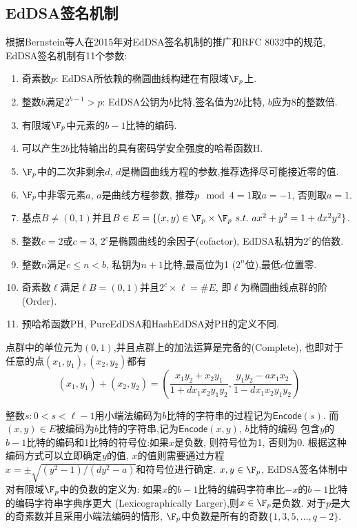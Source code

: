 \subsection{EdDSA签名机制}

根据Bernstein等人在2015年对EdDSA签名机制的推广和RFC 8032中的规范, EdDSA签名机制有11个参数:
\begin{enumerate}
\item 
奇素数$p$: EdDSA所依赖的椭圆曲线构建在有限域$\F_p$上.
\item 
整数$b$满足$2^{b-1} > p$: EdDSA公钥为$b$比特,签名值为$2b$比特, $b$应为8的整数倍.
\item
有限域$\F_p$中元素的$b-1$比特的编码.
\item
可以产生$2b$比特输出的具有密码学安全强度的哈希函数\textsf{H}.
\item
$\F_p$中的二次非剩余$d$, $d$是椭圆曲线方程的参数,推荐选择尽可能接近零的值.
\item
$\F_p$中非零元素$a$, $a$是曲线方程参数, 推荐$p \mod 4=1$取$a=-1$, 否则取$a=1$.
\item 
基点$B \neq (0, 1)$并且$B \in E = \{(x,y) \in \F_p \times \F_p\ s.t.\ ax^2 + y^2 = 1 + dx^2y^2\}$.
\item
整数$c = 2$或$c = 3$, $2^c$是椭圆曲线的余因子(cofactor), EdDSA私钥为$2^c$的倍数.
\item
整数$n$满足$c \leq n < b$, 私钥为$n+1$比特,最高位为1 ($2^n$位),最低$c$位置零.
\item
奇素数$\ell$满足$\ell B = (0,1)$并且$2^c \times \ell = \# E$, 即$\ell$为椭圆曲线点群的阶(Order).
\item
预哈希函数\textsf{PH}, \textsf{PureEdDSA}和\textsf{HashEdDSA}对\textsf{PH}的定义不同.
\end{enumerate}
点群中的单位元为$(0,1)$,并且点群上的加法运算是完备的(Complete), 
也即对于任意的点$(x_1,y_1), (x_2, y_2)$都有
$$(x_1, y_1) + (x_2, y_2) = \left( \frac{x_1y_2 + x_2y_1}{1 + dx_1x_2y_1y_2}, 
\frac{y_1y_2 - ax_1x_2}{1-dx_1x_2y_1y_2}\right)$$

整数$s: 0 < s < \ell - 1$用小端法编码为$b$比特的字符串的过程记为$\textsf{Encode}(s)$.
而$(x,y)\in E$被编码为$b$比特的字符串,记为$\textsf{Encode}(x,y)$, $b$比特的编码
包含$y$的$b-1$比特的编码和1比特的符号位:如果$x$是负数, 则符号位为1, 否则为0.
根据这种编码方式可以立即确定$y$的值, $x$的值则需要通过方程
$x = \pm\sqrt{(y^2-1)/(dy^2-a)}$和符号位进行确定.
$x, y \in \F_p$, EdDSA签名体制中对有限域$\F_p$中的负数的定义为:
如果$x$的$b-1$比特的编码字符串比$-x$的$b-1$比特的编码字符串字典序更大
(Lexicographically Larger),则$x\in\F_p$是负数.
对于$p$是大的奇素数并且采用小端法编码的情形, $\F_p$中负数是所有的奇数$\{1, 3, 5, \ldots, q-2\}$.

